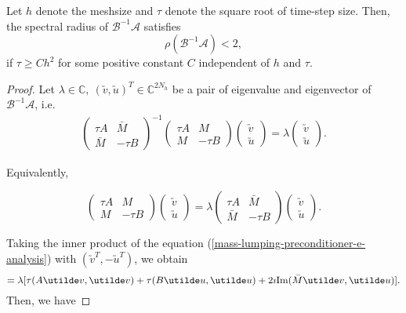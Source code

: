 \documentclass[smallcondensed]{svjour3}
\numberwithin{equation}{section} \numberwithin{table}{section}
\numberwithin{figure}{section}
\numberwithin{algorithm}{section}
\begin{document}
 \begin{theorem} \label{bdyeig}
Let $h$ denote the meshsize and $\tau$ denote the square root of time-step size. Then, the spectral radius of $\mathcal{B}^{-1}\mathcal{A}$ satisfies
$$
\rho(\mathcal{B}^{-1}\mathcal{A})<2,
$$ 
if ${\tau}\geq Ch^2$ for some positive constant $C$ independent of $h$ and $\tau$.
\end{theorem}
\begin{proof}
Let $\lambda\in\mathbb{C},\  (\utilde v,\utilde u)^{T}\in \mathbb{C}^{2 N_h}$ be a pair of eigenvalue and eigenvector of $\mathcal{B}^{-1}\mathcal{A}$, i.e.
\begin{align*}
\begin{pmatrix}
 \tau A&\bar{M} \\
 \bar{M} & -\tau B
\end{pmatrix}^{-1}
\begin{pmatrix}
 \tau A&{M} \\
 {M} & -\tau B
\end{pmatrix}
\begin{pmatrix}
\utilde v\\
\utilde u
\end{pmatrix}
=
\lambda
\begin{pmatrix}
 \utilde v\\
\utilde u
\end{pmatrix}.
\end{align*}

Equivalently,

\begin{equation}
\begin{pmatrix}
 \tau A&{M} \\
 {M} & -\tau B
\end{pmatrix}
\begin{pmatrix}
\utilde v\\
\utilde u
\end{pmatrix}
=
\lambda
\begin{pmatrix}
 \tau A&\bar M \\
 \bar M & -\tau B
\end{pmatrix}
\begin{pmatrix}
\utilde v\\
\utilde u
\end{pmatrix}.
\label{mass-lumping-preconditioner-e-analysis}
\end{equation}

Taking the inner product of the equation (\ref{mass-lumping-preconditioner-e-analysis}) with $(\utilde v^T,-\utilde u^T)$, we obtain
\begin{equation}
[\tau(A\utilde v,\utilde v)+\tau(B\utilde u,\utilde u)+2\imath{\rm{Im}}(M\utilde v,\utilde u)]=\lambda[\tau(A\utilde v,\utilde v)+\tau(B\utilde u,\utilde u)+2\imath{\rm{Im}}(\bar M\utilde v,\utilde u)].
\end{equation}
Then, we have


\end{proof}
\end{document}
